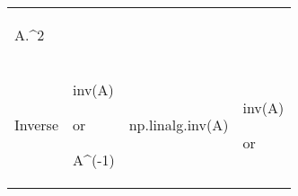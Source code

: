 \documentclass[10pt, landscape]{article}
\newenvironment{Shaded}{}{}
\newcommand{\FloatTok}[1]{\textcolor[rgb]{0.25,0.63,0.44}{{#1}}}
\newcommand{\NormalTok}[1]{{#1}}
\begin{document}
\begin{multicols*}{2}
\begin{table}[ht]
\begin{tabular}[ ]{@{}llll@{}}
\begin{minipage}[t]{0.20\columnwidth}
\begin{Shaded}
\begin{Highlighting}[]
\NormalTok{A.^}\FloatTok{2}
\end{Highlighting}
\end{Shaded}
\strut
\end{minipage}\tabularnewline
\begin{minipage}[t]{0.23\columnwidth}\raggedright\strut
Inverse\strut
\end{minipage} & \begin{minipage}[t]{0.22\columnwidth}\raggedright\strut
\begin{Shaded}
\begin{Highlighting}[]
\NormalTok{inv(A)}
\end{Highlighting}
\end{Shaded}

or

\begin{Shaded}
\begin{Highlighting}[]
\NormalTok{A^(-}\FloatTok{1}\NormalTok{)}
\end{Highlighting}
\end{Shaded}
\strut
\end{minipage} & \begin{minipage}[t]{0.23\columnwidth}\raggedright\strut
\begin{Shaded}
\begin{Highlighting}[]
\NormalTok{np.linalg.inv(A)}
\end{Highlighting}
\end{Shaded}
\strut
\end{minipage} & \begin{minipage}[t]{0.20\columnwidth}\raggedright\strut
\begin{Shaded}
\begin{Highlighting}[]
\NormalTok{inv(A)}
\end{Highlighting}
\end{Shaded}

or


\end{minipage}
\end{tabular}
\end{table}
\end{multicols*}
\end{document}
